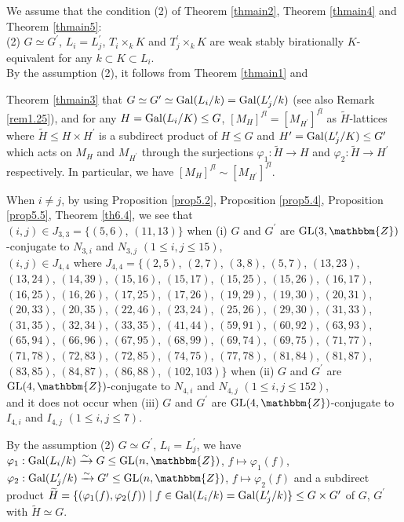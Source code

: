\documentclass{amsart}
\theoremstyle{plain}
\theoremstyle{definition}
\theoremstyle{remark}
\newcommand{\bZ}{\mathbbm{Z}}\newcommand{\bQ}{\mathbbm{Q}}
\newcommand{\GL}{{\rm GL}}\newcommand{\SL}{{\rm SL}}
\newcounter{sub}\def\tr{\mbox{tr }}
\begin{document}
{We assume that the condition {\rm (2)} 
of Theorem \ref{thmain2}, Theorem \ref{thmain4} and Theorem \ref{thmain5}:\\

\noindent 
(2) $G\simeq G^\prime$, $L_i=L_j^\prime$, 
$T_i\times_k K$ and $T_j^\prime\times_k K$ 
are weak stably birationally $K$-equivalent 
for any $k\subset K\subset L_i$.\\

By the assumption {\rm (2)}, it follows from 
{Theorem \ref{thmain1}} and {Theorem \ref{thmain3} that 
$G\simeq  G^\prime\simeq {\rm Gal}(L_i/k)={\rm Gal}(L_j^\prime/k)$ 
(see also Remark \ref{rem1.25}), 
and for any $H={\rm Gal}(L_i/K)\leq G$,  
$[M_H]^{fl}=[M_{H^\prime}]^{fl}$ as $\widetilde{H}$-lattices 
where $\widetilde{H}\leq H\times H^\prime$ is a subdirect product 
of $H\leq G$ and $H^\prime={\rm Gal}(L_j^\prime/K)\leq G^\prime$ 
which acts on $M_H$ and $M_{H^\prime}$ 
through the surjections $\varphi_1: \widetilde{H} \rightarrow H$ 
and $\varphi_2: \widetilde{H} \rightarrow H^\prime$ respectively. 
In particular, we have $[M_H]^{fl}\sim [M_{H^\prime}]^{fl}$. 

When $i\neq j$, 
by using Proposition \ref{prop5.2}, Proposition \ref{prop5.4}, 
Proposition \ref{prop5.5}, Theorem \ref{th6.4}, 
we see that\\ $(i,j)\in J_{3,3}=\{(5,6)$, $(11,13)\}$ when 
{\rm (i)} $G$ and $G^\prime$ are 
$\GL(3,\bZ)$-conjugate to $N_{3,i}$ and $N_{3,j}$ $(1\leq i,j\leq 15)$,\\ 
$(i,j)\in J_{4,4}$ where 
$J_{4,4}=\{(2,5)$, $(2,7)$, $(3,8)$, $(5,7)$, $(13,23)$, 
$(13,24)$, $(14,39)$, $(15,16)$, $(15,17)$, 
$(15,25)$, $(15,26)$, $(16,17)$, $(16,25)$, 
$(16,26)$, $(17,25)$, $(17,26)$, $(19,29)$, 
$(19,30)$, $(20,31)$, $(20,33)$, $(20,35)$, 
$(22,46)$, $(23,24)$, $(25,26)$, $(29,30)$, 
$(31,33)$, $(31,35)$, $(32,34)$, $(33,35)$, 
$(41,44)$, $(59,91)$, $(60,92)$, $(63,93)$, 
$(65,94)$, $(66,96)$, $(67,95)$, $(68,99)$, 
$(69,74)$, $(69,75)$, $(71,77)$, $(71,78)$, 
$(72,83)$, $(72,85)$, $(74,75)$, $(77,78)$, 
$(81,84)$, $(81,87)$, $(83,85)$, 
$(84,87)$, $(86,88)$, $(102,103)\}$ when 
{\rm (ii)} $G$ and $G^\prime$ are 
$\GL(4,\bZ)$-conjugate to $N_{4,i}$ and $N_{4,j}$ $(1\leq i,j\leq 152)$,\\ 
and it does not occur when 
{\rm (iii)} $G$ and $G^\prime$ are 
$\GL(4,\bZ)$-conjugate to $I_{4,i}$ and $I_{4,j}$ $(1\leq i,j\leq 7)$. 

By the assumption (2) $G\simeq G^\prime$, $L_i=L_j^\prime$, 
we have 
$\varphi_1: {\rm Gal}(L_i/k)\xrightarrow{\sim} G\leq {\rm GL}(n,\bZ)$, 
$f\mapsto \varphi_1(f)$, 
$\varphi_2: {\rm Gal}(L_j^\prime/k)\xrightarrow{\sim} G^\prime\leq {\rm GL}(n,\bZ)$, 
$f\mapsto \varphi_2(f)$ and a subdirect product 
$\widetilde{H}=\{(\varphi_1(f),\varphi_2(f))\mid f\in {\rm Gal}(L_i/k)={\rm Gal}(L_j^\prime/k)\}\leq G\times G^\prime$ of $G$, $G^\prime$ with $\widetilde{H}\simeq G$. 
%

}}
\end{document}
